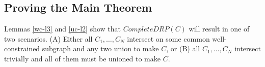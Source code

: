 

\subsection{Proving the Main Theorem}
Lemmas \ref{wc-l3} and \ref{uc-l2} show that $CompleteDRP(C)$ will result in one of two scenarios. (A) Either all $C_1,\ldots,C_N$ intersect on some common well-constrained subgraph and any two union to make $C$, or (B) all $C_1,\ldots,C_N$ intersect trivially and all of them must be unioned to make $C$.














